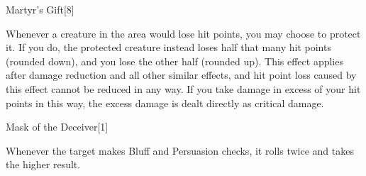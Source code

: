 \begin{spellsection}{Martyr's Gift}[8]
    \begin{spellheader}
    \end{spellheader}
    \begin{spellcontent}
        \begin{spelltargetinginfo}
        \end{spelltargetinginfo}
        \begin{spelleffects}
            \spelleffect Whenever a creature in the area would lose hit points, you may choose to protect it.
            If you do, the protected creature instead loses half that many hit points (rounded down), and you lose the other half (rounded up).
            This effect applies after damage reduction and all other similar effects, and hit point loss caused by this effect cannot be reduced in any way.
            If you take damage in excess of your hit points in this way, the excess damage is dealt directly as critical damage.
        \end{spelleffects}
    \end{spellcontent}
    \begin{spellfooter}
        \miscastexplode
    \end{spellfooter}
\end{spellsection}

\begin{spellsection}{Mask of the Deceiver}[1]
    \begin{spellheader}
    \end{spellheader}
    \begin{spellcontent}
        \begin{spelltargetinginfo}
        \end{spelltargetinginfo}
        \begin{spelleffects}
            \spelleffect Whenever the target makes Bluff and Persuasion checks, it rolls twice and takes the higher result.
            \spelldur \durshort
        \end{spelleffects}
    \end{spellcontent}
    \begin{spellfooter}
        \miscastexplode
    \end{spellfooter}
    \begin{spellaugments}
    \end{spellaugments}
\end{spellsection}

